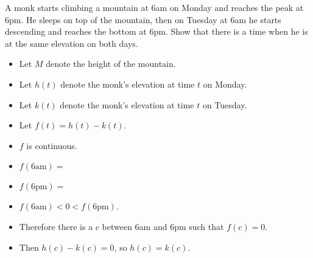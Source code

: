 \begin{frame}
\begin{example}
A monk starts climbing a mountain at 6am on Monday and reaches the peak at 6pm.  He sleeps on top of the mountain, then on Tuesday at 6am he starts descending and reaches the bottom at 6pm.  Show that there is a time when he is at the same elevation on both days.  

\begin{itemize}
\item<2->  Let $M$ denote the height of the mountain.  
\item<3->  Let $h(t)$ denote the monk's elevation at time $t$ on Monday.  
\item<3->  Let $k(t)$ denote the monk's elevation at time $t$ on Tuesday.  
\item<4->  Let $f(t) = h(t) - k(t)$.  
\item<5->  $f$ is continuous.  
\item<6->  \alert<6-7>{$f(6\text{am}) = $ }
\item<8->  \alert<8-9>{$f(6\text{pm}) = $ }
\item<10->  $f(6\text{am}) < 0 < f(6\text{pm})$.  
\item<11->  Therefore there is a $c$ between 6am and 6pm such that $f(c) = 0$.
\item<12->  Then $h(c) -k(c) = 0$, so $h(c) = k(c)$.  
\end{itemize}

\end{example}
\end{frame}
